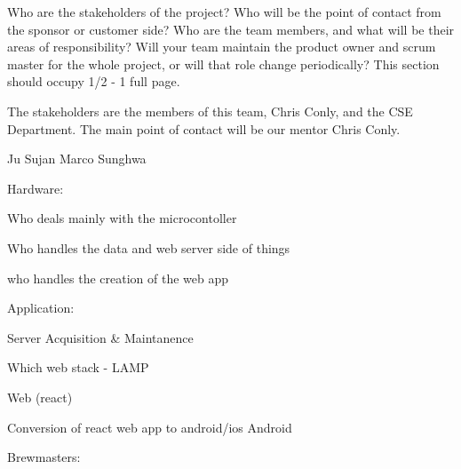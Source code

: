 Who are the stakeholders of the project? Who will be the point of contact from the sponsor or customer side? Who are the team members, and what will be their areas of responsibility? Will your team maintain the product owner and scrum master for the whole project, or will that role change periodically? This section should occupy 1/2 - 1 full page.


The stakeholders are the members of this team, Chris Conly, and the CSE Department. The main point of contact will be our mentor Chris Conly.

\vspace{5mm}




Ju
Sujan
Marco
Sunghwa


Hardware:
  

Who deals mainly with the microcontoller 

Who handles the data and web server side of things

who handles the creation of the web app

Application:

  Server Acquisition \& Maintanence

         Which web stack - LAMP
  
         Web (react)
         
  Conversion of react web app to android/ios
  Android



Brewmasters:
